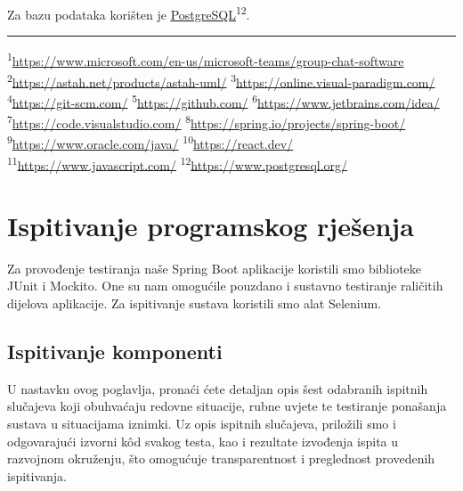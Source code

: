 			\indent Za bazu podataka korišten je \underline{\href{https://www.postgresql.org/}{PostgreSQL}}\textsuperscript{12}.
			\noindent\\[1ex]\rule{0.5\linewidth}{0.5pt}\newline
			\noindent\textsuperscript{1}\url{https://www.microsoft.com/en-us/microsoft-teams/group-chat-software}\newline
			\noindent\textsuperscript{2}\url{https://astah.net/products/astah-uml/}\newline
			\noindent\textsuperscript{3}\url{https://online.visual-paradigm.com/}\newline
			\noindent\textsuperscript{4}\url{https://git-scm.com/}\newline
			\noindent\textsuperscript{5}\url{https://github.com/}\newline
			\noindent\textsuperscript{6}\url{https://www.jetbrains.com/idea/}\newline
			\noindent\textsuperscript{7}\url{https://code.visualstudio.com/}\newline
			\noindent\textsuperscript{8}\url{https://spring.io/projects/spring-boot/}\newline
			\noindent\textsuperscript{9}\url{https://www.oracle.com/java/}\newline
			\noindent\textsuperscript{10}\url{https://react.dev/}\newline
			\noindent\textsuperscript{11}\url{https://www.javascript.com/}\newline
			\noindent\textsuperscript{12}\url{https://www.postgresql.org/}\newline
			
		\newpage
		
		\section{Ispitivanje programskog rješenja}
			
			\indent Za provođenje testiranja naše Spring Boot aplikacije koristili smo biblioteke JUnit i Mockito. One su nam omogućile pouzdano i sustavno testiranje raličitih dijelova aplikacije. Za ispitivanje sustava koristili smo alat Selenium.
			 
	
			
			\subsection{Ispitivanje komponenti}
			U nastavku ovog poglavlja, pronaći ćete detaljan opis šest odabranih ispitnih slučajeva koji obuhvaćaju redovne situacije, rubne uvjete te testiranje ponašanja sustava u situacijama iznimki. Uz opis ispitnih slučajeva, priložili smo i odgovarajući izvorni kôd svakog testa, kao i rezultate izvođenja ispita u razvojnom okruženju, što omogućuje transparentnost i preglednost provedenih ispitivanja.
			
